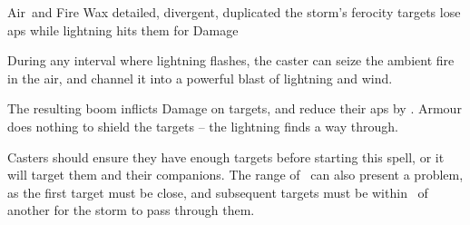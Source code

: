   {Air\ and Fire}%
  {Wax}%
  {detailed, divergent, duplicated}%
  {the storm's ferocity}%
  { targets lose  \glspl{ap} while lightning hits them for  Damage}%
  {
    During any \gls{interval} where lightning flashes, the caster can seize the ambient fire in the air, and channel it into a powerful blast of lightning and wind.

    The resulting boom inflicts  Damage on  targets, and reduce their \glspl{ap} by .
    Armour does nothing to shield the targets -- the lightning finds a way through.

    Casters should ensure they have enough targets before starting this spell, or it will target them and their companions.
    The range of \spellRange\ can also present a problem, as the first target must be close, and subsequent targets must be within \spellRange\ of another for the storm to pass through them.
  }
